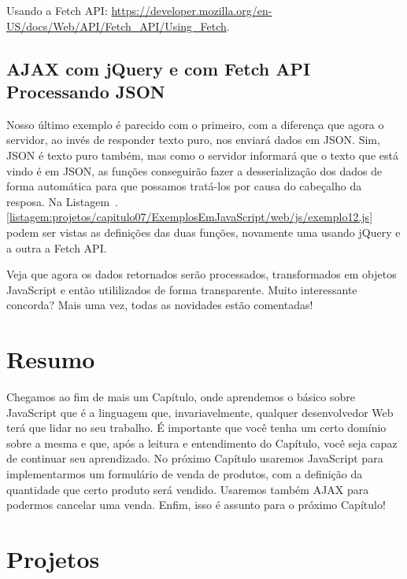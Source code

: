 \begin{saibaMais}
    Usando a Fetch API: \url{https://developer.mozilla.org/en-US/docs/Web/API/Fetch_API/Using_Fetch}.
\end{saibaMais}


\subsection{AJAX com jQuery e com Fetch API Processando JSON}

Nosso último exemplo é parecido com o primeiro, com a diferença que agora o servidor, ao invés de responder texto puro, nos enviará dados em JSON. Sim, JSON é texto puro também, mas como o servidor informará que o texto que está vindo é em JSON, as funções conseguirão fazer a desserialização dos dados de forma automática para que possamos tratá-los por causa do cabeçalho da resposa. Na Listagem~\thechapter.\ref{listagem:projetos/capitulo07/ExemplosEmJavaScript/web/js/exemplo12.js} podem ser vistas as definições das duas funções, novamente uma usando jQuery e a outra a Fetch API.


Veja que agora os dados retornados serão processados, transformados em objetos JavaScript e então utililizados de forma transparente. Muito interessante concorda? Mais uma vez, todas as novidades estão comentadas!



\section{Resumo}

Chegamos ao fim de mais um Capítulo, onde aprendemos o básico sobre JavaScript que é a linguagem que, invariavelmente, qualquer desenvolvedor Web terá que lidar no seu trabalho. É importante que você tenha um certo domínio sobre a mesma e que, após a leitura e entendimento do Capítulo, você seja capaz de continuar seu aprendizado. No próximo Capítulo usaremos JavaScript para implementarmos um formulário de venda de produtos, com a definição da quantidade que certo produto será vendido. Usaremos também AJAX para podermos cancelar uma venda. Enfim, isso é assunto para o próximo Capítulo!



\section{Projetos}

